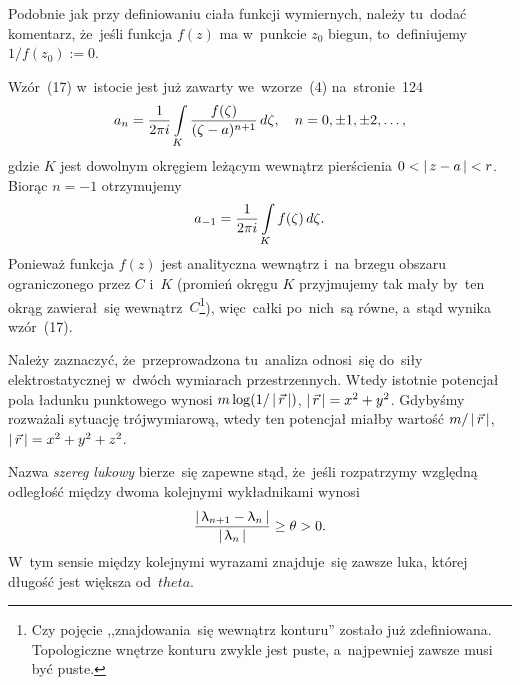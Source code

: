 \documentclass[a4paper,11pt]{article}
\begin{document}
\vspace{\spaceFour}


\start {} Podobnie jak przy definiowaniu ciała funkcji
wymiernych, należy tu~dodać komentarz, że~jeśli funkcja $f( z )$ ma
w~punkcie $z_{ 0 }$ biegun, to~definiujemy $1 / f( z_{ 0 } ) := 0$.

\vspace{\spaceFour}


\start {} Wzór~(17) w~istocie jest już zawarty we~wzorze~(4)
na~stronie~124
\begin{equation}
  \label{eq:Leja-43}
  a_{ n } = \frac{ 1 }{ 2\pi i }
  \int\limits_{ K } \frac{ f( \zeta ) }{ ( \zeta - a )^{ n + 1 } } \, d\zeta,
  \quad n = 0, \pm 1, \pm 2, \ldots,
\end{equation}
gdzie $K$ jest dowolnym okręgiem leżącym wewnątrz pierścienia
$0 < \left| \,  z - a  \, \right| < r$. Biorąc $n = -1$ otrzymujemy
\begin{equation}
  \label{eq:Leja-44}
  a_{ -1 } = \frac{ 1 }{ 2\pi i } \int\limits_{ K } f( \zeta )\, d\zeta.
\end{equation}
Ponieważ funkcja $f( z )$ jest analityczna wewnątrz i~na brzegu
obszaru ograniczonego przez $C$ i~$K$ (promień okręgu $K$ przyjmujemy
tak mały by~ten okrąg zawierał~się wewnątrz~$C$\footnote{Czy pojęcie
  ,,znajdowania~się wewnątrz konturu'' zostało już zdefiniowana.
  Topologiczne wnętrze konturu zwykle jest puste, a~najpewniej zawsze
  musi być puste.}), więc~całki po~nich~są równe, a~stąd wynika
wzór~(17).

\vspace{\spaceFour}


\start {} Należy zaznaczyć, że~przeprowadzona tu~analiza
odnosi~się do~siły elektrostatycznej w~dwóch wymiarach przestrzennych.
Wtedy istotnie potencjał pola ładunku punktowego wynosi
$m \log(1 / \left| \,  \vec{ r }  \, \right| )$, $\left| \,  \vec{ r }  \, \right| = x^{ 2 } + y^{ 2 }$.
Gdybyśmy rozważali sytuację trójwymiarową, wtedy ten potencjał miałby
wartość $m / \left| \,  \vec{ r }  \, \right|$,
$\left| \,  \vec{ r }  \, \right| = x^{ 2 } + y^{ 2 } + z^{ 2 }$.

\vspace{\spaceFour}


\start {} Nazwa \emph{szereg lukowy} bierze~się zapewne stąd,
że~jeśli rozpatrzymy względną odległość między dwoma kolejnymi
wykładnikami wynosi
\begin{equation}
  \label{eq:Leja-45}
  \frac{ \left| \,  \uplambda_{ n + 1 } - \uplambda_{ n }  \, \right| }{ \left| \,  \uplambda_{ n }  \, \right| }
  \geq \theta > 0.
\end{equation}
W~tym sensie między kolejnymi wyrazami znajduje~się zawsze luka,
której długość jest większa od~$theta$.
\end{document}
